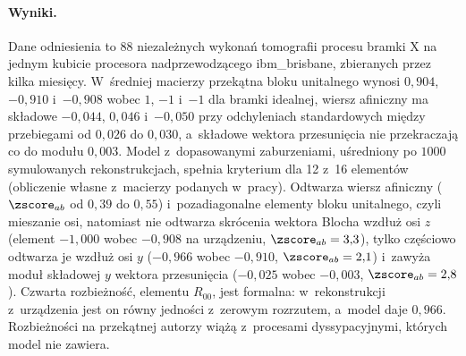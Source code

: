 \paragraph{Wyniki.}
Dane odniesienia to 88 niezależnych wykonań tomografii procesu bramki $\mathrm{X}$ na jednym kubicie procesora nadprzewodzącego ibm\_brisbane, zbieranych przez kilka miesięcy.
W~średniej macierzy przekątna bloku unitalnego wynosi $0{,}904$, $-0{,}910$ i~$-0{,}908$ wobec $1$, $-1$ i~$-1$ dla bramki idealnej, wiersz afiniczny ma składowe $-0{,}044$, $0{,}046$ i~$-0{,}050$ przy odchyleniach standardowych między przebiegami od $0{,}026$ do $0{,}030$, a~składowe wektora przesunięcia nie przekraczają co do modułu $0{,}003$.
Model z~dopasowanymi zaburzeniami, uśredniony po $1000$ symulowanych rekonstrukcjach, spełnia kryterium dla 12 z~16 elementów (obliczenie własne z~macierzy podanych w~pracy).
Odtwarza wiersz afiniczny ($\zscore_{ab}$ od $0{,}39$ do $0{,}55$) i~pozadiagonalne elementy bloku unitalnego, czyli mieszanie osi, natomiast nie odtwarza skrócenia wektora Blocha wzdłuż osi $z$ (element $-1{,}000$ wobec $-0{,}908$ na urządzeniu, $\zscore_{ab}=3{,}3$), tylko częściowo odtwarza je wzdłuż osi $y$ ($-0{,}966$ wobec $-0{,}910$, $\zscore_{ab}=2{,}1$) i~zawyża moduł składowej $y$ wektora przesunięcia ($-0{,}025$ wobec $-0{,}003$, $\zscore_{ab}=2{,}8$).
Czwarta rozbieżność, elementu $R_{00}$, jest formalna: w~rekonstrukcji z~urządzenia jest on równy jedności z~zerowym rozrzutem, a~model daje $0{,}966$.
Rozbieżności na przekątnej autorzy wiążą z~procesami dyssypacyjnymi, których model nie zawiera.


